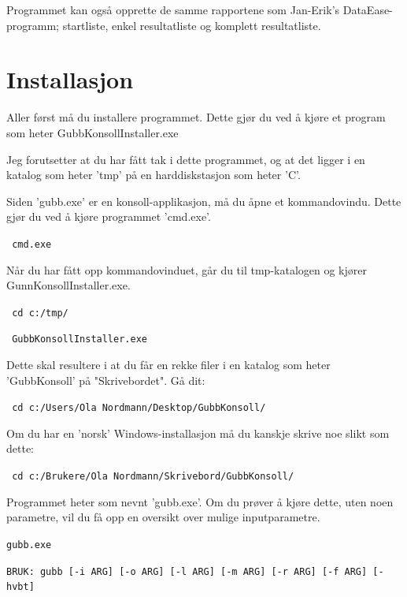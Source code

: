\documentclass[12pt]{book}
\begin{document}
Programmet kan også opprette de samme rapportene som Jan-Erik's DataEase-programm; startliste, enkel resultatliste og komplett resultatliste.

\newpage

\section{Installasjon}

Aller først må du installere programmet. Dette gjør du ved å kjøre et program som heter GubbKonsollInstaller.exe 

Jeg forutsetter at du har fått tak i dette programmet, og at det ligger i en katalog som heter 'tmp' på en harddiskstasjon som heter 'C'. 

Siden 'gubb.exe' er en konsoll-applikasjon, må du åpne et kommandovindu. Dette gjør du ved å kjøre programmet 'cmd.exe'.

\begin{alltt}
\texttt{ cmd.exe  {\Return} }
\end{alltt}

Når du har fått opp kommandovinduet, går du til tmp-katalogen og kjører GunnKonsollInstaller.exe.

\begin{alltt}
\texttt{ cd c:/tmp/  {\Return} }

\texttt{ GubbKonsollInstaller.exe  {\Return} }
\end{alltt}

Dette skal resultere i at du får en rekke filer i en katalog som heter  'GubbKonsoll'  på "Skrivebordet". Gå dit:

\begin{alltt}
\texttt{ cd c:/Users/Ola Nordmann/Desktop/GubbKonsoll/  {\Return} }
\end{alltt}

Om du har en 'norsk' Windows-installasjon må du kanskje skrive noe slikt som dette:

\begin{alltt}
\texttt{ cd c:/Brukere/Ola Nordmann/Skrivebord/GubbKonsoll/  {\Return} }
\end{alltt}


Programmet heter som nevnt 'gubb.exe'. Om du prøver å kjøre dette, uten noen parametre, vil du få opp en oversikt over mulige inputparametre.

\begin{alltt}
\texttt{gubb.exe  {\Return} }

\texttt{BRUK: gubb [-i ARG] [-o ARG] [-l ARG] [-m ARG] [-r ARG] [-f ARG] [-hvbt]  }
\end{alltt}
\end{document}
